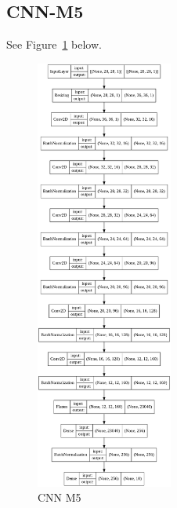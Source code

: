 \documentclass{article}
\begin{document}
\subsection{CNN-M5} \label{cnn_5}
See Figure~\ref{cnn_m5_demo} below.
\begin{figure}[h]
    \centering
    \includegraphics[width=0.40\textwidth]{figure/custom-m5.png}
    \caption{CNN M5}
    \label{cnn_m5_demo}
\end{figure}
\end{document}
